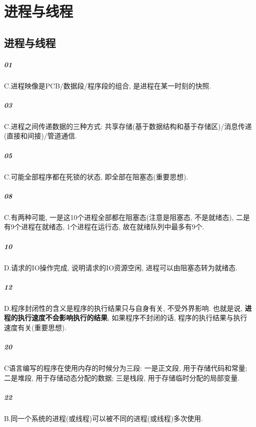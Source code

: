 \chapter{进程与线程}
\section{进程与线程}
\paragraph{01} C.进程映像是PCB/数据段/程序段的组合, 是进程在某一时刻的快照.
\paragraph{03} C.进程之间传递数据的三种方式: 共享存储(基于数据结构和基于存储区)/消息传递(直接和间接)/管道通信.
\paragraph{05} C.可能全部程序都在死锁的状态, 即全部在阻塞态(重要思想).
\paragraph{08} C.有两种可能, 一是这10个进程全部都在阻塞态(注意是阻塞态, 不是就绪态), 二是有9个进程在就绪态, 1个进程在运行态, 故在就绪队列中最多有9个.
\paragraph{10} D.请求的IO操作完成, 说明请求的IO资源空闲, 进程可以由阻塞态转为就绪态.
\paragraph{12} D.程序封闭性的含义是程序的执行结果只与自身有关, 不受外界影响. 也就是说, \textbf{进程的执行速度不会影响执行的结果}, 如果程序不封闭的话, 程序的执行结果与执行速度有关(重要思想).
\paragraph{20} C语言编写的程序在使用内存的时候分为三段: 一是正文段, 用于存储代码和常量; 二是堆段, 用于存储动态分配的数据; 三是栈段, 用于存储临时分配的局部变量.
\paragraph{22} B.同一个系统的进程(或线程)可以被不同的进程(或线程)多次使用.










